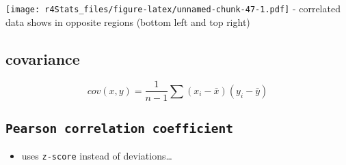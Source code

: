 \documentclass[
]{book}
\newenvironment{Shaded}{\begin{snugshade}}{\end{snugshade}}
\newcommand{\AttributeTok}[1]{\textcolor[rgb]{0.77,0.63,0.00}{#1}}
\newcommand{\CommentTok}[1]{\textcolor[rgb]{0.56,0.35,0.01}{\textit{#1}}}
\newcommand{\DecValTok}[1]{\textcolor[rgb]{0.00,0.00,0.81}{#1}}
\newcommand{\FunctionTok}[1]{\textcolor[rgb]{0.00,0.00,0.00}{#1}}
\newcommand{\NormalTok}[1]{#1}
\newcommand{\OtherTok}[1]{\textcolor[rgb]{0.56,0.35,0.01}{#1}}
\newcommand{\SpecialCharTok}[1]{\textcolor[rgb]{0.00,0.00,0.00}{#1}}
\newcommand{\StringTok}[1]{\textcolor[rgb]{0.31,0.60,0.02}{#1}}
\providecommand{\tightlist}{%
  \setlength{\itemsep}{0pt}\setlength{\parskip}{0pt}}
\theoremstyle{definition}
\theoremstyle{definition}
\theoremstyle{definition}
\theoremstyle{definition}
\theoremstyle{remark}
\begin{document}
\begin{Shaded}
\end{Shaded}

\texttt{[image: r4Stats\_files/figure-latex/unnamed-chunk-47-1.pdf]}
- correlated data shows in opposite regions (bottom left and top right)

\hypertarget{covariance}{%
\subsection{covariance}\label{covariance}}

\[
cov(x,y)=\frac{1}{n-1}\sum(x_i-\bar{x})(y_i-\bar{y})
\]

\hypertarget{pearson-correlation-coefficient}{%
\subsection{\texorpdfstring{\texttt{Pearson\ correlation\ coefficient}}{Pearson correlation coefficient}}\label{pearson-correlation-coefficient}}

\begin{itemize}
\tightlist
\item
  uses \texttt{z-score} instead of deviations\ldots{}
\end{itemize}
\end{document}
